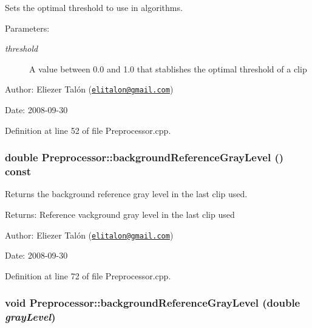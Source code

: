 Sets the optimal threshold to use in algorithms. 

\begin{Desc}
\item[Parameters:]
\begin{description}
\item[{\em threshold}]A value between 0.0 and 1.0 that stablishes the optimal threshold of a clip\end{description}
\end{Desc}
\begin{Desc}
\item[Author:]Eliezer Talón (\href{mailto:elitalon@gmail.com}{\tt elitalon@gmail.com}) \end{Desc}
\begin{Desc}
\item[Date:]2008-09-30 \end{Desc}


Definition at line 52 of file Preprocessor.cpp.\hypertarget{class_preprocessor_159a9059fc811585eb9363e76ad16148}{
\subsubsection[backgroundReferenceGrayLevel]{\setlength{\rightskip}{0pt plus 5cm}double Preprocessor::backgroundReferenceGrayLevel () const}}
\label{class_preprocessor_159a9059fc811585eb9363e76ad16148}


Returns the background reference gray level in the last clip used. 

\begin{Desc}
\item[Returns:]Reference vackground gray level in the last clip used\end{Desc}
\begin{Desc}
\item[Author:]Eliezer Talón (\href{mailto:elitalon@gmail.com}{\tt elitalon@gmail.com}) \end{Desc}
\begin{Desc}
\item[Date:]2008-09-30 \end{Desc}


Definition at line 72 of file Preprocessor.cpp.\hypertarget{class_preprocessor_86d53fb28912d95eea53823a57772c54}{
\subsubsection[backgroundReferenceGrayLevel]{\setlength{\rightskip}{0pt plus 5cm}void Preprocessor::backgroundReferenceGrayLevel (double {\em grayLevel})}}
\label{class_preprocessor_86d53fb28912d95eea53823a57772c54}


